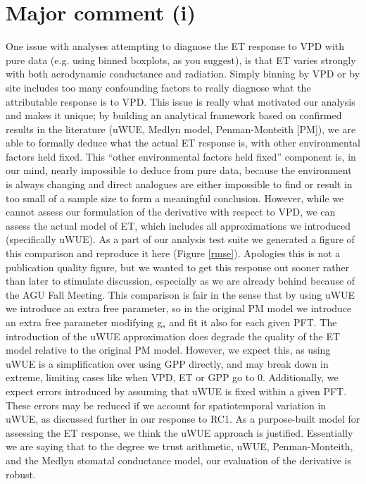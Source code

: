 \documentclass[12pt]{article}
\begin{document}
\section{Major comment (i)}
\label{i}
One issue with analyses attempting to diagnose the ET response to VPD
with pure data (e.g. using binned boxplots, as you suggest), is that
ET varies strongly with both aerodynamic conductance and
radiation. Simply binning by VPD or by site includes too many
confounding factors to really diagnose what the attributable response
is to VPD. This issue is really what motivated our analysis and makes
it unique; by building an analytical framework based on confirmed
results in the literature (uWUE, Medlyn model, Penman-Monteith [PM]),
we are able to formally deduce what the actual ET response is, with
other environmental factors held fixed. This ``other environmental
factors held fixed'' component is, in our mind, nearly impossible to
deduce from pure data, because the environment is always changing and
direct analogues are either impossible to find or result in too small
of a sample size to form a meaningful conclusion. However, while we
cannot assess our formulation of the derivative with respect to VPD,
we can assess the actual model of ET, which includes all
approximations we introduced (specifically uWUE). As a part of our
analysis test suite we generated a figure of this comparison and
reproduce it here (Figure \ref{rmse}). Apologies this is not a
publication quality figure, but we wanted to get this response out
sooner rather than later to stimulate discussion, especially as we are
already behind because of the AGU Fall Meeting. This comparison is
fair in the sense that by using uWUE we introduce an extra free
parameter, so in the original PM model we introduce an extra free
parameter modifying g$_s$ and fit it also for each given PFT. The
introduction of the uWUE approximation does degrade the quality of the
ET model relative to the original PM model. However, we expect this,
as using uWUE is a simplification over using GPP directly, and may
break down in extreme, limiting cases like when VPD, ET or GPP go to
0. Additionally, we expect errors introduced by assuming that uWUE is
fixed within a given PFT. These errors may be reduced if we account
for spatiotemporal variation in uWUE, as discussed further in our
response to RC1.  As a purpose-built model for assessing the ET
response, we think the uWUE approach is justified. Essentially we are
saying that to the degree we trust arithmetic, uWUE, Penman-Monteith,
and the Medlyn stomatal conductance model, our evaluation of the
derivative is robust.
\end{document}
